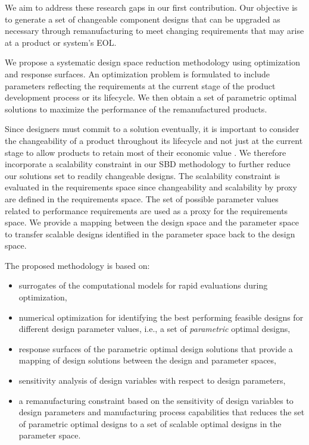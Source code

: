 We aim to address these research gaps in our first contribution. Our objective is to generate a set of changeable component designs that can be upgraded as necessary through remanufacturing to meet changing requirements that may arise at a product or system's \ac{EOL}. 

We propose a systematic design space reduction methodology using optimization and response surfaces. An optimization problem is formulated to include parameters reflecting the requirements at the current stage of the product development process or its lifecycle. We then obtain a set of parametric optimal solutions to maximize the performance of the remanufactured products. 

Since designers must commit to a solution eventually, it is important to consider the {changeability} of a product throughout its lifecycle and not just at the current stage to allow products to retain most of their economic value \cite{Fricke2005}. We therefore incorporate a scalability constraint in our \ac{SBD} methodology to further reduce our solutions set to readily changeable designs. The scalability constraint is evaluated in the requirements space since changeability and scalability by proxy are defined in the requirements space. The set of possible parameter values related to performance requirements are used as a proxy for the requirements space. We provide a mapping between the design space and the parameter space to transfer scalable designs identified in the parameter space back to the design space.

The proposed methodology is based on:
\begin{itemize}
	\item surrogates of the computational models for rapid evaluations during optimization,
	\item numerical optimization for identifying the best performing feasible designs for different design parameter values, i.e., a set of \textit{parametric} optimal designs,%
	\item response surfaces of the parametric optimal design solutions that provide a mapping of design solutions between the design and parameter spaces,
	\item sensitivity analysis of design variables with respect to design parameters,
	\item a remanufacturing constraint based on the sensitivity of design variables to design parameters and manufacturing process capabilities that reduces the set of parametric optimal designs to a set of {scalable} optimal designs in the parameter space.
\end{itemize}

